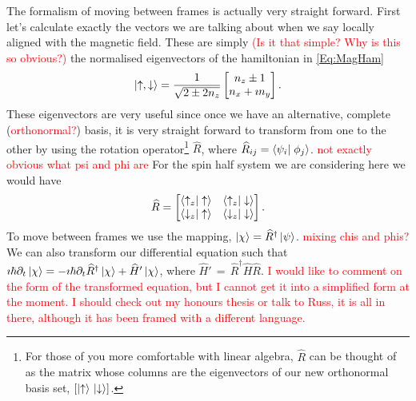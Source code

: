 The formalism of moving between frames is actually very straight forward.
First let's calculate exactly the vectors we are talking about when we say locally aligned with the magnetic field.
These are simply \textcolor{red}{(Is it that simple? Why is this so obvious?)} the normalised eigenvectors of the hamiltonian in \autoref{Eq:MagHam}
\begin{equation}
    \ket{\uparrow,\downarrow} = \frac{1}{\sqrt{2\pm 2n_z}} \begin{bmatrix} n_z \pm 1\\
                                                                           n_x + \imath n_y \end{bmatrix}.
\end{equation}
These eigenvectors are very useful since once we have an alternative, complete (\textcolor{red}{orthonormal?}) basis, it is very straight forward to transform from one to the other by using the rotation operator\footnote{For those of you more comfortable with linear algebra, $\widehat{R}$ can be thought of as the matrix whose columns are the eigenvectors of our new orthonormal basis set, \ie $\left[\ket{\uparrow}\, \ket{\downarrow}\right]$.} $\widehat{R}$, where $\widehat{R}_{ij} = \bra{\psi_i}\left.\phi_j\right>$. \textcolor{red}{not exactly obvious what psi and phi are}
For the spin half system we are considering here we would have
\begin{equation}
    \widehat{R} = \begin{bmatrix} \bra{\uparrow_z}\left.\uparrow\right>   & \bra{\uparrow_z}\left.\downarrow\right>\\
                              \bra{\downarrow_z}\left.\uparrow\right> & \bra{\downarrow_z}\left.\downarrow\right>
              \end{bmatrix}.
\end{equation}
To move between frames we use the mapping, $\ket{\chi} = \widehat{R}^{\dagger} \ket{\psi}$. \textcolor{red}{mixing chis and phis?}
We can also transform our differential equation such that $\imath\hbar \partial_t \ket{\chi} = -\imath\hbar \partial_t\widehat{R}^{\dagger}\ket{\chi} + \widehat{H}' \ket{\chi}$, where $\widehat{H}'\,=\,\widehat{R}^{\dagger} \widehat{H} \widehat{R}$.
\textcolor{red}{I would like to comment on the form of the transformed equation, but I cannot get it into a simplified form at the moment. I should check out my honours thesis or talk to Russ, it is all in there, although it has been framed with a different language.}

